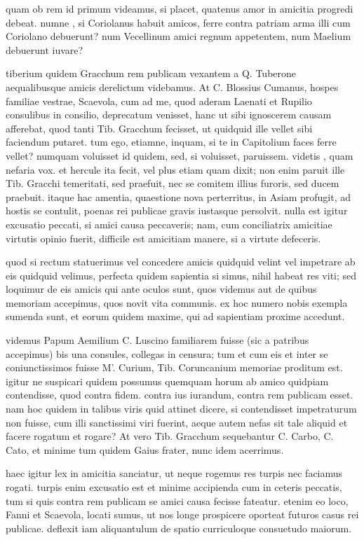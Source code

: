  quam ob rem id primum videamus, si placet, quatenus amor in amicitia progredi debeat. numne , si Coriolanus habuit amicos, ferre contra patriam arma illi cum Coriolano debuerunt? num Vecellinum amici regnum appetentem, num Maelium debuerunt iuvare?

 tiberium quidem Gracchum rem publicam vexantem a Q. Tuberone aequalibusque amicis derelictum videbamus. At C. Blossius Cumanus, hospes familiae vestrae, Scaevola, cum ad me, quod aderam Laenati et Rupilio consulibus in consilio, deprecatum venisset, hanc ut sibi ignoscerem causam afferebat, quod tanti Tib. Gracchum fecisset, ut quidquid ille vellet sibi faciendum putaret. tum ego, etiamne, inquam, si te in Capitolium faces ferre vellet? numquam voluisset id quidem, sed, si voluisset, paruissem. videtis , quam nefaria vox. et hercule ita fecit, vel plus etiam quam dixit; non enim paruit ille Tib. Gracchi temeritati, sed praefuit, nec se comitem illius furoris, sed ducem praebuit. itaque hac amentia, quaestione nova perterritus, in Asiam profugit, ad hostis se contulit, poenas rei publicae gravis iustasque persolvit. nulla est igitur excusatio peccati, si amici causa peccaveris; nam, cum conciliatrix amicitiae virtutis opinio fuerit, difficile est amicitiam manere, si a virtute defeceris.

 quod si rectum statuerimus vel concedere amicis quidquid velint vel impetrare ab eis quidquid velimus, perfecta quidem sapientia si simus, nihil habeat res viti; sed loquimur de eis amicis qui ante oculos sunt, quos videmus aut de quibus memoriam accepimus, quos novit vita communis. ex hoc numero nobis exempla sumenda sunt, et eorum quidem maxime, qui ad sapientiam proxime accedunt.

 videmus Papum Aemilium C. Luscino familiarem fuisse (sic a patribus accepimus) bis una consules, collegas in censura; tum et cum eis et inter se coniunctissimos fuisse M'. Curium, Tib. Coruncanium memoriae proditum est. igitur ne suspicari quidem possumus quemquam horum ab amico quidpiam contendisse, quod contra fidem. contra ius iurandum, contra rem publicam esset. nam hoc quidem in talibus viris quid attinet dicere, si contendisset impetraturum non fuisse, cum illi sanctissimi viri fuerint, aeque autem nefas sit tale aliquid et facere rogatum et rogare? At vero Tib. Gracchum sequebantur C. Carbo, C. Cato, et minime tum quidem Gaius frater, nunc idem acerrimus.

 haec igitur lex in amicitia sanciatur, ut neque rogemus res turpis nec faciamus rogati. turpis enim excusatio est et minime accipienda cum in ceteris peccatis, tum si quis contra rem publicam se amici causa fecisse fateatur. etenim eo loco, Fanni et Scaevola, locati sumus, ut nos longe prospicere oporteat futuros casus rei publicae. deflexit iam aliquantulum de spatio curriculoque consuetudo maiorum.

